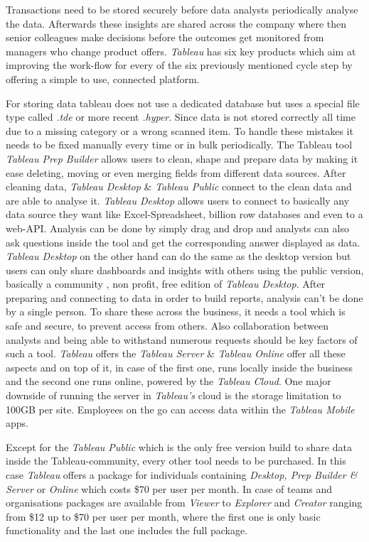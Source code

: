 \documentclass[../paper.tex]{subfiles}
\begin{document}
Transactions need to be stored securely before data analysts periodically analyse the data. Afterwards these insights are shared across the company where then senior colleagues make decisions before the outcomes get monitored from managers who change product offers. \textit{Tableau} has six key products which aim at improving the work-flow for every of the six previously mentioned cycle step by offering a simple to use, connected platform. 

For storing data tableau does not use a dedicated database but uses a special file type called \textit{.tde} or more recent \textit{.hyper}. Since data is not stored correctly all time due to a missing category or a wrong scanned item. To handle these mistakes it needs to be fixed manually every time or in bulk periodically. The Tableau tool \textit{Tableau Prep Builder} allows users to clean, shape and prepare data by making it ease deleting, moving or even merging fields from different data sources. After cleaning data, \textit{Tableau Desktop} \& \textit{Tableau Public} connect to the clean data and are able to analyse it. \textit{Tableau Desktop} allows users to connect to basically any data source they want like Excel-Spreadsheet, billion row databases and even to a web-API.  Analysis can be done by simply drag and drop and analysts can also ask questions inside the tool and get the corresponding answer displayed as data. \textit{Tableau Desktop} on the other hand can do the same as the desktop version but users can only share dashboards and insights with others using the public version, basically a community , non profit, free edition of \textit{Tableau Desktop}. After preparing and connecting to data in order to build reports, analysis can't be done by a single person. To share these across the business, it needs a tool which is safe and secure, to prevent access from others. Also collaboration between analysts and being able to withstand numerous requests should be key factors of such a tool. \textit{Tableau} offers the \textit{Tableau Server} \& \textit{Tableau Online} offer all these aspects and on top of it, in case of the first one, runs locally inside the business and the second one runs online, powered by the \textit{Tableau Cloud}. One major downside of running the server in \textit{Tableau's} cloud is the storage limitation to 100GB per site. Employees on the go can access data within the \textit{Tableau Mobile} apps.

Except for the \textit{Tableau Public} which is the only free version build to share data inside the Tableau-community, every other tool needs to be purchased. In this case \textit{Tableau} offers a package for individuals containing \textit{Desktop, Prep Builder \& Server} or \textit{Online} which costs \$70 per user per month. In case of teams and organisations packages are available from \textit{Viewer} to \textit{Explorer} and \textit{Creator} ranging from \$12 up to \$70 per user per month, where the first one is only basic functionality and the last one includes the full package.
\end{document}
